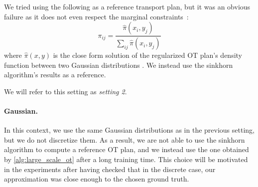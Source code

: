 \documentclass[a4paper,11pt]{article}
\newcommand{\1}{\mathbbm{1}}
\begin{document}
We tried using the following as a reference transport plan, but it was an obvious failure as it does not even respect the marginal constraints~:
\begin{equation}
    \pi_{ij} = \frac{\widehat{\pi}(x_i, y_j)}{\sum\limits_{ij} \widehat{\pi}(x_i, y_j)}
\end{equation}
where $\widehat{\pi}(x, y)$ is the close form solution of the regularized OT plan's density function between two Gaussian distributions \citep{janati2020entropicoptimaltransportunbalanced}. We instead use the sinkhorn algorithm's results as a reference.%

We will refer to this setting as \emph{setting 2}.




\paragraph{Gaussian.}In this context, we use the same Gaussian distributions as in the previous setting, but we do not discretize them. As a result, we are not able to use the sinkhorn algorithm to compute a reference OT plan, and we instead use the one obtained by \cref{alg:large_scale_ot} after a long training time. This choice will be motivated in the experiments after having checked that in the discrete case, our approximation was close enough to the chosen ground truth.
\end{document}
